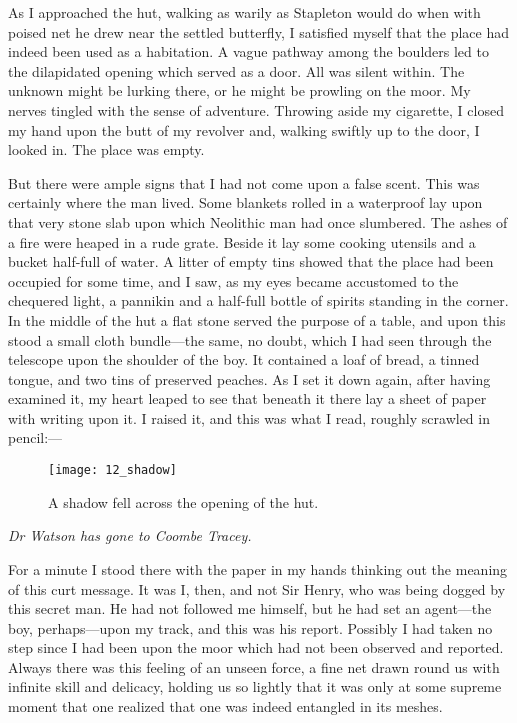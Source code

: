 As I approached the hut, walking as warily as Stapleton would do when with poised net he drew near the settled butterfly, I satisfied myself that the place had indeed been used as a habitation. A vague pathway among the boulders led to the dilapidated opening which served as a door. All was silent within. The unknown might be lurking there, or he might be prowling on the moor. My nerves tingled with the sense of adventure. Throwing aside my cigarette, I closed my hand upon the butt of my revolver and, walking swiftly up to the door, I looked in. The place was empty.

But there were ample signs that I had not come upon a false scent. This was certainly where the man lived. Some blankets rolled in a waterproof lay upon that very stone slab upon which Neolithic man had once slumbered. The ashes of a fire were heaped in a rude grate. Beside it lay some cooking utensils and a bucket half-full of water. A litter of empty tins showed that the place had been occupied for some time, and I saw, as my eyes became accustomed to the chequered light, a pannikin and a half-full bottle of spirits standing in the corner. In the middle of the hut a flat stone served the purpose of a table, and upon this stood a small cloth bundle—the same, no doubt, which I had seen through the telescope upon the shoulder of the boy. It contained a loaf of bread, a tinned tongue, and two tins of preserved peaches. As I set it down again, after having examined it, my heart leaped to see that beneath it there lay a sheet of paper with writing upon it. I raised it, and this was what I read, roughly scrawled in pencil:— 

\begin{figure}[p]
\centering
\texttt{[image: 12\_shadow]}
\caption{A shadow fell across the opening of the hut.}
\end{figure}

\textit{Dr Watson has gone to Coombe Tracey.}

For a minute I stood there with the paper in my hands thinking out the meaning of this curt message. It was I, then, and not Sir Henry, who was being dogged by this secret man. He had not followed me himself, but he had set an agent—the boy, perhaps—upon my track, and this was his report. Possibly I had taken no step since I had been upon the moor which had not been observed and reported. Always there was this feeling of an unseen force, a fine net drawn round us with infinite skill and delicacy, holding us so lightly that it was only at some supreme moment that one realized that one was indeed entangled in its meshes.

